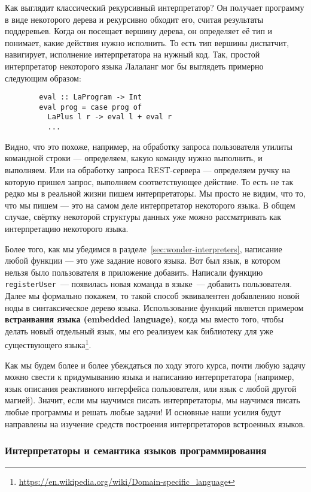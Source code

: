 \documentclass[12pt]{article}
\newcommand{\vocab}[1]{\textbf{#1}} %
\begin{document}
    Как выглядит классический рекурсивный интерпретатор?
    Он получает программу в виде некоторого дерева и рекурсивно обходит его, считая результаты поддеревьев.
    Когда он посещает вершину дерева, он определяет её тип и понимает, какие действия нужно исполнить.
    То есть тип вершины диспатчит, навигирует, исполнение интерпретатора на нужный код.
    Так, простой интерпретатор некоторого языка Лалаланг мог бы выглядеть примерно следующим образом:
    \begin{verbatim}
        eval :: LaProgram -> Int
        eval prog = case prog of
          LaPlus l r -> eval l + eval r
          ...
    \end{verbatim}

    Видно, что это похоже, например, на обработку запроса пользователя утилиты командной строки --- определяем, какую команду нужно выполнить, и выполняем.
    Или на обработку запроса REST-сервера --- определяем ручку на которую пришел запрос, выполняем соответствующее действие.
    То есть не так редко мы в реальной жизни пишем интерпретаторы.
    Мы просто не видим, что то, что мы пишем --- это на самом деле интерпретатор некоторого языка.
    В общем случае, свёртку некоторой структуры данных уже можно рассматривать как интерпретацию некоторого языка.

    Более того, как мы убедимся в разделе~\ref{sec:wonder-interpreters}, написание любой функции --- это уже задание нового языка.
    Вот был язык, в котором нельзя было пользователя в приложение добавить.
    Написали функцию \texttt{registerUser}~--- появилась новая команда в языке~--- добавить пользователя.
    Далее мы формально покажем, то такой способ эквивалентен добавлению новой ноды в синтаксическое дерево языка.
    Использование функций является примером \vocab{встраивания языка (embedded language)}, когда мы вместо того, чтобы делать новый отдельный язык, мы его реализуем как библиотеку для уже существующего языка\footnote{\url{https://en.wikipedia.org/wiki/Domain-specific_language}}.

    Как мы будем более и более убеждаться по ходу этого курса, почти любую задачу можно свести к придумыванию языка и написанию интерпретатора (например, язык описания реактивного интерфейса пользователя, или язык с любой другой магией).
    Значит, если мы научимся писать интерпретаторы, мы научимся писать любые программы и решать любые задачи!
    И основные наши усилия будут направлены на изучение средств построения интерпретаторов встроенных языков.

    \subsubsection{Интерпретаторы и семантика языков программирования}
\end{document}
